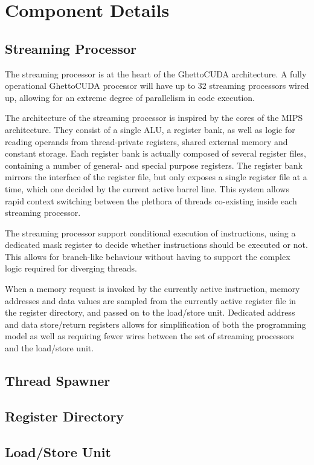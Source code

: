 \section{Component Details}

\subsection{Streaming Processor}

The streaming processor is at the heart of the GhettoCUDA architecture.
A fully operational GhettoCUDA processor will have up to 32 streaming processors wired up, allowing for an extreme degree of parallelism in code execution.

The architecture of the streaming processor is inspired by the cores of the MIPS architecture.
They consist of a single ALU, a register bank, as well as logic for reading operands from thread-private registers, shared external memory and constant storage.
Each register bank is actually composed of several register files, containing a number of general- and special purpose registers.
The register bank mirrors the interface of the register file, but only exposes a single register file at a time, which one decided by the current active barrel line.
This system allows rapid context switching between the plethora of threads co-existing inside each streaming processor.

The streaming processor support conditional execution of instructions, using a dedicated mask register to decide whether instructions should be executed or not.
This allows for branch-like behaviour without having to support the complex logic required for diverging threads.

When a memory request is invoked by the currently active instruction, memory addresses and data values are sampled from the currently active register file in the register directory, and passed on to the load/store unit.
Dedicated address and data store/return registers allows for simplification of both the programming model as well as requiring fewer wires between the set of streaming processors and the load/store unit.

\subsection{Thread Spawner}

\subsection{Register Directory}

\subsection{Load/Store Unit}

